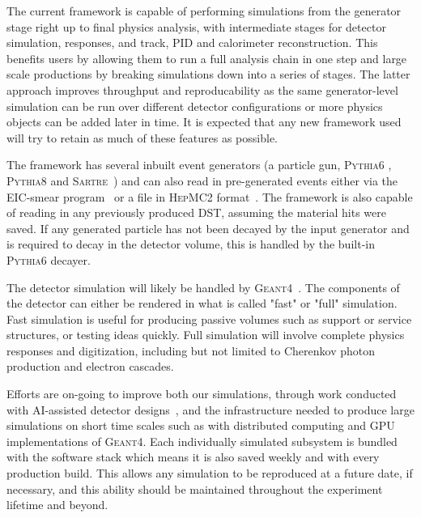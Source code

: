 	The current framework is capable of performing simulations from the generator stage right up to final physics analysis, with intermediate stages for detector simulation, responses, and track, PID and calorimeter reconstruction. This benefits users by allowing them to run a full analysis chain in one step and large scale productions by breaking simulations down into a series of stages. The latter approach improves throughput and reproducability as the same generator-level simulation can be run over different detector configurations or more physics objects can be added later in time. It is expected that any new framework used will try to retain as much of these features as possible.
	
	The framework has several inbuilt event generators (a particle gun, \textsc{Pythia6} \cite{Sjostrand:2000wi}, \textsc{Pythia8} \cite{sjostrand2008brief} and \textsc{Sartre}~\cite{toll2014dipole}) and can also read in pre-generated events either via the EIC-smear program~\cite{eicsmear} or a file in \textsc{HepMC2} format~\cite{dobbs2001hepmc}. The framework is also capable of reading in any previously produced DST, assuming the material hits were saved. If any generated particle has not been decayed by the input generator and is required to decay in the detector volume, this is handled by the built-in \textsc{Pythia6} decayer. 
	
	The detector simulation will likely be handled by \textsc{Geant4}~\cite{Agostinelli:2002hh}. The components of the detector can either be rendered in what is called "fast" or "full" simulation. Fast simulation is useful for producing passive volumes such as support or service structures, or testing ideas quickly. Full simulation will involve complete physics responses and digitization, including but not limited to Cherenkov photon production and electron cascades. 
	
	Efforts are on-going to improve both our simulations, through work conducted with AI-assisted detector designs~\cite{ecce-note-comp-2021-03}, and the infrastructure needed to produce large simulations on short time scales such as with distributed computing and GPU implementations of \textsc{Geant4}. Each individually simulated subsystem is bundled with the software stack which means it is also saved weekly and with every production build. This allows any simulation to be reproduced at a future date, if necessary, and this ability should be maintained throughout the experiment lifetime and beyond. 
	
